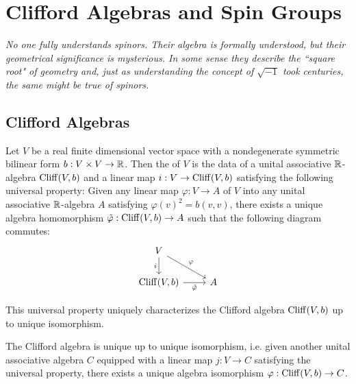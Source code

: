 
\chapter{Clifford Algebras and Spin Groups}
%
\subsectionend
$ $\\
\emph{No one fully understands spinors. Their algebra is formally understood,
but their geometrical significance is mysterious. In some sense they describe
the ``square root" of geometry and, just as understanding the concept of
$\sqrt{-1}$ took centuries, the same might be true of spinors.} \\
%
%
\subsectionend
%
\section{Clifford Algebras}
%
\begin{defn}
Let $V$ be a real finite dimensional vector space with a nondegenerate
symmetric bilinear form $b : V \times V \to \mathbb{R}$. Then the 
of $V$ is the data of a unital associative $\mathbb{R}$-algebra $\operatorname{Cliff}(V,b)$ and a linear
map $i : V \to \operatorname{Cliff}(V,b)$ satisfying the following universal property:
Given any linear map $\varphi : V \to A$ of $V$ into any unital associative
$\mathbb{R}$-algebra $A$ satisfying $\varphi(v)^2 = b(v,v)$, there exists a unique algebra
homomorphism $\tilde{\varphi}: \operatorname{Cliff}(V,b) \to A$ such that the following
diagram commutes:
%
\[\begin{tikzcd}
V \ar[dr, "\varphi"] \ar[d, "i"'] \\
\Cliff(V,b) \ar[r, "\tilde{\varphi}"'] & A
\end{tikzcd}\]
\end{defn}
%
This universal property uniquely characterizes the Clifford algebra $\operatorname{Cliff}(V,b)$
up to unique isomorphism.
%
\begin{thm}
The Clifford algebra is unique up to unique isomorphism, i.e. given
another unital associative algebra $C$ equipped with a linear map $j : V \to C$
satisfying the universal property, there exists a unique algebra isomorphism
$\varphi : \operatorname{Cliff}(V,b) \to C$.
\end{thm}
%
